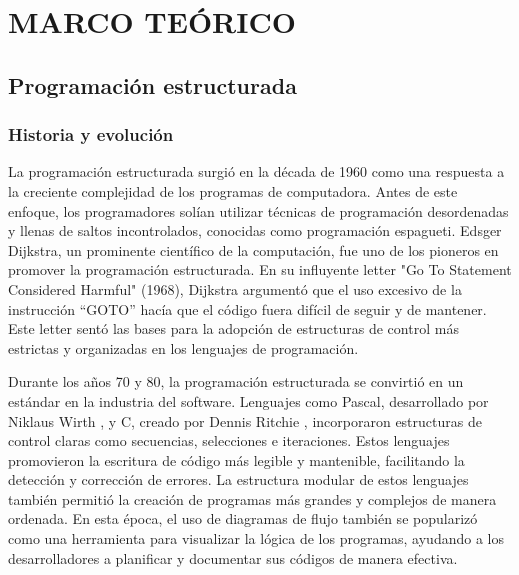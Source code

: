 \chapter{MARCO TEÓRICO}
\section{Programación estructurada}
\subsection{Historia y evolución}
La programación estructurada surgió en la década de 1960 como una respuesta a la creciente complejidad de los programas de computadora. Antes de este enfoque, los programadores solían utilizar técnicas de programación desordenadas y llenas de saltos incontrolados, conocidas como programación espagueti. Edsger Dijkstra, un prominente científico de la computación, fue uno de los pioneros en promover la programación estructurada. En su influyente letter "Go To Statement Considered Harmful" (1968), Dijkstra argumentó que el uso excesivo de la instrucción “GOTO” hacía que el código fuera difícil de seguir y de mantener. Este letter sentó las bases para la adopción de estructuras de control más estrictas y organizadas en los lenguajes de programación. \parencite{Dijkstra1968}

Durante los años 70 y 80, la programación estructurada se convirtió en un estándar en la industria del software. Lenguajes como Pascal, desarrollado por Niklaus Wirth \parencite{Barron1981}, y C, creado por Dennis Ritchie \parencite{Kernighan1988}, incorporaron estructuras de control claras como secuencias, selecciones e iteraciones. Estos lenguajes promovieron la escritura de código más legible y mantenible, facilitando la detección y corrección de errores. La estructura modular de estos lenguajes también permitió la creación de programas más grandes y complejos de manera ordenada. En esta época, el uso de diagramas de flujo también se popularizó como una herramienta para visualizar la lógica de los programas, ayudando a los desarrolladores a planificar y documentar sus códigos de manera efectiva.

